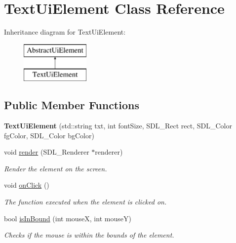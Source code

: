 \hypertarget{class_text_ui_element}{}\section{Text\+Ui\+Element Class Reference}
\label{class_text_ui_element}
Inheritance diagram for Text\+Ui\+Element\+:\begin{figure}[H]
\begin{center}
\leavevmode
\includegraphics[height=2.000000cm]{class_text_ui_element}
\end{center}
\end{figure}
\subsection*{Public Member Functions}
\begin{DoxyCompactItemize}
\item 
\mbox{\label{class_text_ui_element_a9386fa02eac98da9c8f71b6e2b2a88fb}} 
{\bfseries Text\+Ui\+Element} (std\+::string txt, int font\+Size, S\+D\+L\+\_\+\+Rect rect, S\+D\+L\+\_\+\+Color fg\+Color, S\+D\+L\+\_\+\+Color bg\+Color)
\item 
void \mbox{\hyperlink{class_text_ui_element_a7931ba283acdf102442a9181b3ddf276}{render}} (S\+D\+L\+\_\+\+Renderer $\ast$renderer)
\begin{DoxyCompactList}\small\item\em Render the element on the screen. \end{DoxyCompactList}\item 
void \mbox{\hyperlink{class_text_ui_element_a984d8bcd627f43c1bd858a707df2c042}{on\+Click}} ()
\begin{DoxyCompactList}\small\item\em The function executed when the element is clicked on. \end{DoxyCompactList}\item 
bool \mbox{\hyperlink{class_text_ui_element_aaf04a9d0a67e77e2ba2a306e1ec7aeed}{is\+In\+Bound}} (int mouseX, int mouseY)
\begin{DoxyCompactList}\small\item\em Checks if the mouse is within the bounds of the element. \end{DoxyCompactList}\end{DoxyCompactItemize}

